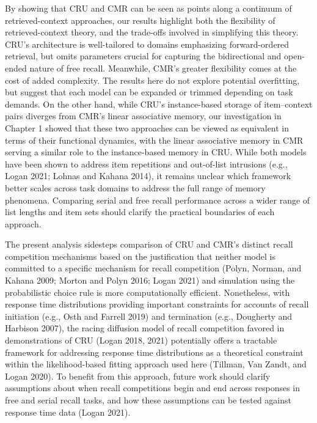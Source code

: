 \documentclass[
  letterpaper,
  11pt,
  english,
  singlespacing,
  headsepline]{MastersDoctoralThesis}
\begin{document}
By showing that CRU and CMR can be seen as points along a continuum of
retrieved-context approaches, our results highlight both the flexibility
of retrieved-context theory, and the trade-offs involved in simplifying
this theory. CRU's architecture is well-tailored to domains emphasizing
forward-ordered retrieval, but omits parameters crucial for capturing
the bidirectional and open-ended nature of free recall. Meanwhile, CMR's
greater flexibility comes at the cost of added complexity. The results
here do not explore potential overfitting, but suggest that each model
can be expanded or trimmed depending on task demands. On the other hand,
while CRU's instance-based storage of item--context pairs diverges from
CMR's linear associative memory, our investigation in Chapter 1 showed
that these two approaches can be viewed as equivalent in terms of their
functional dynamics, with the linear associative memory in CMR serving a
similar role to the instance-based memory in CRU. While both models have
been shown to address item repetitions and out-of-list intrusions (e.g.,
Logan 2021; Lohnas and Kahana 2014), it remains unclear which framework
better scales across task domains to address the full range of memory
phenomena. Comparing serial and free recall performance across a wider
range of list lengths and item sets should clarify the practical
boundaries of each approach.

The present analysis sidesteps comparison of CRU and CMR's distinct
recall competition mechanisms based on the justification that neither
model is committed to a specific mechanism for recall competition
(Polyn, Norman, and Kahana 2009; Morton and Polyn 2016; Logan 2021) and
simulation using the probabilistic choice rule is more computationally
efficient. Nonetheless, with response time distributions providing
important constraints for accounts of recall initiation (e.g., Osth and
Farrell 2019) and termination (e.g., Dougherty and Harbison 2007), the
racing diffusion model of recall competition favored in demonstrations
of CRU (Logan 2018, 2021) potentially offers a tractable framework for
addressing response time distributions as a theoretical constraint
within the likelihood-based fitting approach used here (Tillman, Van
Zandt, and Logan 2020). To benefit from this approach, future work
should clarify assumptions about when recall competitions begin and end
across responses in free and serial recall tasks, and how these
assumptions can be tested against response time data (Logan 2021).
\end{document}
